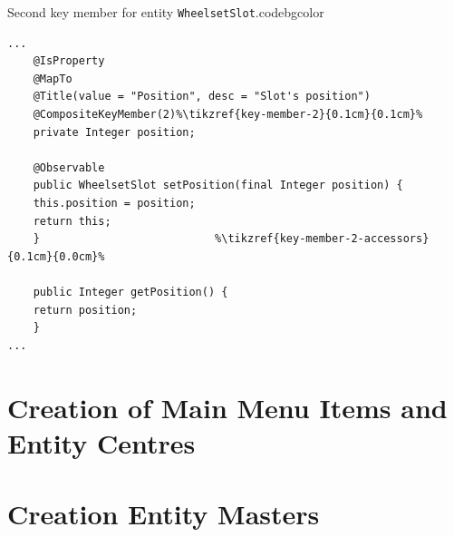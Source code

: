    \lstset{firstnumber=13}
  \begin{code}{Second key member for entity \texttt{WheelsetSlot}.}{\label{lst:ch02:00:WheelsetSlot-key-2}}{codebgcolor}
  \begin{lstlisting}
...
    @IsProperty
    @MapTo
    @Title(value = "Position", desc = "Slot's position")
    @CompositeKeyMember(2)%\tikzref{key-member-2}{0.1cm}{0.1cm}%
    private Integer position;

    @Observable
    public WheelsetSlot setPosition(final Integer position) {
	this.position = position;
	return this;
    }                           %\tikzref{key-member-2-accessors}{0.1cm}{0.0cm}%
                                            
    public Integer getPosition() {
	return position;
    }
...
  \end{lstlisting}
  \vspace*{-7px}
\end{code}              
    
    
\section{Creation of Main Menu Items and Entity Centres}  
  
  
\section{Creation Entity Masters}
  
